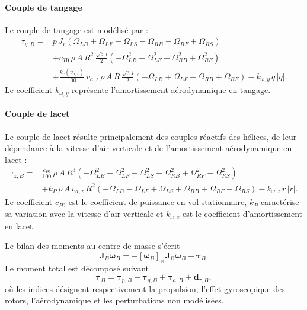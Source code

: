 \documentclass[11pt,a4paper,oneside]{report}
\newcommand{\vect}[1]{\bm{#1}}
\newcommand{\mat}[1]{\bm{#1}}
\newcommand{\crossmat}[1]{\left[#1\right]_{\times}}
\begin{document}
	\paragraph{Couple de tangage}
	Le couple de tangage est modélisé par :
	\begin{align}
		\tau_{y,B}={}&p\,J_r\left(\Omega_{LB}+\Omega_{LF}-\Omega_{LS}-\Omega_{RB}-\Omega_{RF}+\Omega_{RS}\right)\nonumber\\
		&+c_{T0}\,\rho\,A\,R^2\,\frac{\sqrt{3}\,l}{2}\left(-\Omega_{LB}^2+\Omega_{LF}^2-\Omega_{RB}^2+\Omega_{RF}^2\right)\nonumber\\
		&+\frac{k_c(v_{a,z})}{100}\,v_{a,z}\,\rho\,A\,R\,\frac{\sqrt{3}\,l}{2}\left(-\Omega_{LB}+\Omega_{LF}-\Omega_{RB}+\Omega_{RF}\right)-k_{\omega,y}\,q\,|q|.
		\label{eq_pitch_torque}
	\end{align}
	Le coefficient \(k_{\omega,y}\) représente l'amortissement aérodynamique en tangage.
	
	\paragraph{Couple de lacet}
	Le couple de lacet résulte principalement des couples réactifs des hélices, de leur dépendance à la vitesse d'air verticale et de l'amortissement aérodynamique en lacet :
	\begin{align}
		\tau_{z,B}={}&\frac{c_{P0}}{100}\,\rho\,A\,R^3\left(-\Omega_{LB}^2-\Omega_{LF}^2+\Omega_{LS}^2+\Omega_{RB}^2+\Omega_{RF}^2-\Omega_{RS}^2\right)\nonumber\\
		&+k_P\,\rho\,A\,v_{a,z}\,R^2\left(-\Omega_{LB}-\Omega_{LF}+\Omega_{LS}+\Omega_{RB}+\Omega_{RF}-\Omega_{RS}\right)-k_{\omega,z}\,r\,|r|.
		\label{eq_yaw_torque}
	\end{align}
	Le coefficient \(c_{P0}\) est le coefficient de puissance en vol stationnaire, \(k_P\) caractérise sa variation avec la vitesse d'air verticale et \(k_{\omega,z}\) est le coefficient d'amortissement en lacet.
	
	
	
	
	
	
	
	
	
	
	Le bilan des moments au centre de masse s'écrit
	\begin{equation}
		\mat J_B\dot{\vect\omega}_B=-\crossmat{\vect\omega_B}\mat J_B\vect\omega_B+\vect\tau_B.
		\label{eq_rotation_dynamics}
	\end{equation}
	Le moment total est décomposé suivant
	\begin{equation}
		\vect\tau_B=\vect\tau_{p,B}+\vect\tau_{g,B}+\vect\tau_{a,B}+\vect d_{\tau,B},
		\label{eq_torque_decomposition}
	\end{equation}
	où les indices désignent respectivement la propulsion, l'effet gyroscopique des rotors, l'aérodynamique et les perturbations non modélisées.
	
\end{document}
